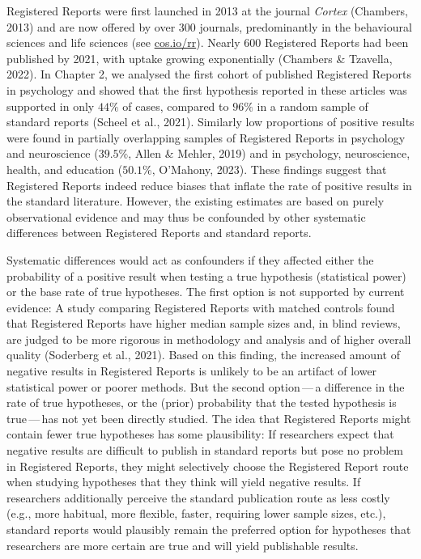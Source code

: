 \documentclass[
  ,man,mask,floatsintext]{apa6}
\begin{document}
Registered Reports were first launched in 2013 at the journal \emph{Cortex} (Chambers, 2013) and are now offered by over 300 journals, predominantly in the behavioural sciences and life sciences (see \url{cos.io/rr}).
Nearly 600 Registered Reports had been published by 2021, with uptake growing exponentially (Chambers \& Tzavella, 2022).
In Chapter 2, we analysed the first cohort of published Registered Reports in psychology and showed that the first hypothesis reported in these articles was supported in only \(44\%\) of cases, compared to \(96\%\) in a random sample of standard reports (Scheel et al., 2021).
Similarly low proportions of positive results were found in partially overlapping samples of Registered Reports in psychology and neuroscience (\(39.5\%\), Allen \& Mehler, 2019) and in psychology, neuroscience, health, and education (\(50.1\%\), O'Mahony, 2023).
These findings suggest that Registered Reports indeed reduce biases that inflate the rate of positive results in the standard literature.
However, the existing estimates are based on purely observational evidence and may thus be confounded by other systematic differences between Registered Reports and standard reports.

Systematic differences would act as confounders if they affected either the probability of a positive result when testing a true hypothesis (statistical power) or the base rate of true hypotheses.
The first option is not supported by current evidence:
A study comparing Registered Reports with matched controls found that Registered Reports have higher median sample sizes and, in blind reviews, are judged to be more rigorous in methodology and analysis and of higher overall quality (Soderberg et al., 2021).
Based on this finding, the increased amount of negative results in Registered Reports is unlikely to be an artifact of lower statistical power or poorer methods.
But the second option\(\,\)---\(\,\)a difference in the rate of true hypotheses, or the (prior) probability that the tested hypothesis is true\(\,\)---\(\,\)has not yet been directly studied.
The idea that Registered Reports might contain fewer true hypotheses has some plausibility:
If researchers expect that negative results are difficult to publish in standard reports but pose no problem in Registered Reports, they might selectively choose the Registered Report route when studying hypotheses that they think
will yield negative results.
If researchers additionally perceive the standard publication route as less costly (e.g., more habitual, more flexible, faster, requiring lower sample sizes, etc.), standard reports would plausibly remain the preferred option for hypotheses that researchers are more certain are true and will yield publishable results.
\end{document}
